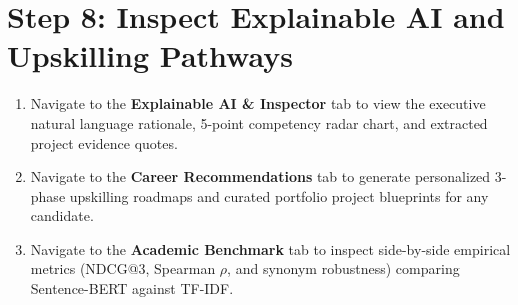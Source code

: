 \documentclass[12pt,a4paper]{report}
\begin{document}
\section*{Step 8: Inspect Explainable AI and Upskilling Pathways}
\begin{enumerate}
    \item Navigate to the \textbf{Explainable AI \& Inspector} tab to view the executive natural language rationale, 5-point competency radar chart, and extracted project evidence quotes.
    \item Navigate to the \textbf{Career Recommendations} tab to generate personalized 3-phase upskilling roadmaps and curated portfolio project blueprints for any candidate.
    \item Navigate to the \textbf{Academic Benchmark} tab to inspect side-by-side empirical metrics (NDCG@3, Spearman $\rho$, and synonym robustness) comparing Sentence-BERT against TF-IDF.
\end{enumerate}
\end{document}
